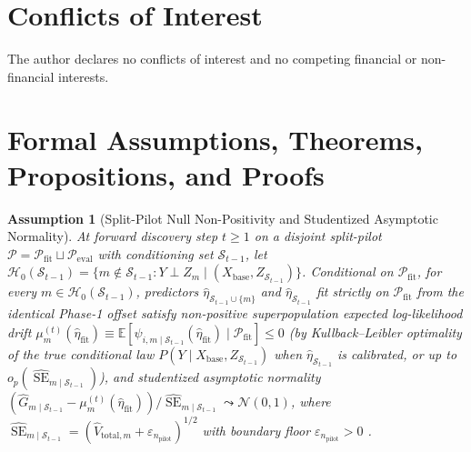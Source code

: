 \documentclass[11pt]{article}
\newtheorem{assumption}{Assumption}
\theoremstyle{remark}
\begin{document}
\section*{Conflicts of Interest}

The author declares no conflicts of interest and no competing financial or non-financial interests.

\appendix

\section{Formal Assumptions, Theorems, Propositions, and Proofs}
\label{app:proofs}

\begin{assumption}[Split-Pilot Null Non-Positivity and Studentized Asymptotic Normality]
\label{assump:null_nonpos}
At forward discovery step $t \ge 1$ on a disjoint split-pilot $\mathcal{P} = \mathcal{P}_{\text{fit}} \sqcup \mathcal{P}_{\text{eval}}$ with conditioning set $\mathcal{S}_{t-1}$, let $\mathcal{H}_0(\mathcal{S}_{t-1}) = \{m \notin \mathcal{S}_{t-1} : Y \perp Z_m \mid (X_{\text{base}}, Z_{\mathcal{S}_{t-1}})\}$. Conditional on $\mathcal{P}_{\text{fit}}$, for every $m \in \mathcal{H}_0(\mathcal{S}_{t-1})$, predictors $\hat{\eta}_{\mathcal{S}_{t-1}\cup\{m\}}$ and $\hat{\eta}_{\mathcal{S}_{t-1}}$ fit strictly on $\mathcal{P}_{\text{fit}}$ from the identical Phase-1 offset satisfy non-positive superpopulation expected log-likelihood drift $\mu_{m}^{(t)}(\hat{\eta}_{\text{fit}}) \equiv \mathbb{E}[\psi_{i, m \mid \mathcal{S}_{t-1}}(\hat{\eta}_{\text{fit}}) \mid \mathcal{P}_{\text{fit}}] \le 0$ (by Kullback--Leibler optimality of the true conditional law $P(Y \mid X_{\text{base}}, Z_{\mathcal{S}_{t-1}})$ when $\hat{\eta}_{\mathcal{S}_{t-1}}$ is calibrated, or up to $o_p(\widehat{\operatorname{SE}}_{m \mid \mathcal{S}_{t-1}})$), and studentized asymptotic normality $(\hat{G}_{m \mid \mathcal{S}_{t-1}} - \mu_{m}^{(t)}(\hat{\eta}_{\text{fit}})) / \widehat{\operatorname{SE}}_{m \mid \mathcal{S}_{t-1}} \leadsto \mathcal{N}(0, 1)$, where $\widehat{\operatorname{SE}}_{m \mid \mathcal{S}_{t-1}} = (\widehat{V}_{\text{total},m} + \varepsilon_{n_{\text{pilot}}})^{1/2}$ with boundary floor $\varepsilon_{n_{\text{pilot}}} > 0$ \citep{williamson2021nonparametric,williamson2023general}.
\end{assumption}
\end{document}
